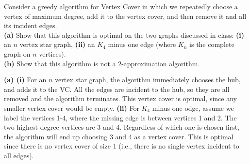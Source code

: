 \documentclass[fleqn]{homework}
\begin{document}
  \maketitle

  \begin{problem}{1}
    \begin{question}
      Consider a greedy algorithm for Vertex Cover in which we repeatedly choose
      a vertex of maximum degree, add it to the vertex cover, and then remove it
      and all its incident edges. \\
      \textbf{(a)} Show that this algorithm is optimal on the two graphs
      discussed in class: \textbf{(i)} an $n$ vertex star graph, \textbf{(ii)}
      an $K_4$ minus one edge (where $K_n$ is the complete graph on $n$ vertices).\\
      \textbf{(b)} Show that this algorithm is not a 2-approximation algorithm.
    \end{question}
    \textbf{(a) (i)} For an $n$ vertex star graph, the algorithm immediately
    chooses the hub, and adds it to the VC.  All the edges are incident to the
    hub, so they are all removed and the algorithm terminates.  This vertex
    cover is optimal, since any smaller vertex cover would be empty.
    \textbf{(ii)} For $K_4$ minus one odge, assume we label the vertices 1-4,
    where the missing edge is between vertices 1 and 2.  The two highest degree
    vertices are 3 and 4.  Regardless of which one is chosen first, the
    algorithm will end up choosing 3 and 4 as a vertex cover.  This is optimal
    since there is no vertex cover of size 1 (i.e., there is no single vertex
    incident to all edges).
  \end{problem}
\end{document}
